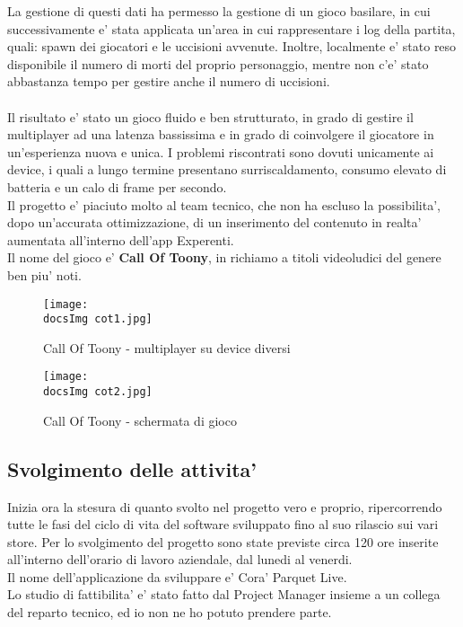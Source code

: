 La gestione di questi dati ha permesso la gestione di un gioco basilare, in cui successivamente e' stata applicata un'area in cui rappresentare i log della partita, quali: spawn dei giocatori e le uccisioni avvenute. Inoltre, localmente e' stato reso disponibile il numero di morti del proprio personaggio, mentre non c'e' stato abbastanza tempo per gestire anche il numero di uccisioni.\\\\
Il risultato e' stato un gioco fluido e ben strutturato, in grado di gestire il multiplayer ad una latenza bassissima e in grado di coinvolgere il giocatore in un'esperienza nuova e unica. I problemi riscontrati sono dovuti unicamente ai device, i quali a lungo termine presentano surriscaldamento, consumo elevato di batteria e un calo di frame per secondo.\\
Il progetto e' piaciuto molto al team tecnico, che non ha escluso la possibilita', dopo un'accurata ottimizzazione, di un inserimento del contenuto in realta' aumentata all'interno dell'app Experenti.\\
Il nome del gioco e' \textbf{Call Of Toony}, in richiamo a titoli videoludici del genere ben piu' noti.

\begin{figure}[H]
	\centering
	\texttt{[image: \\docsImg cot1.jpg]}
	\caption{Call Of Toony - multiplayer su device diversi}
	\label{fig:Call Of Toony - multiplayer}
\end{figure}

\begin{figure}[H]
	\centering
	\texttt{[image: \\docsImg cot2.jpg]}
	\caption{Call Of Toony - schermata di gioco}
	\label{fig:Call Of Toony - schermata di gioco}
\end{figure}

\subsection{Svolgimento delle attivita'}
Inizia ora la stesura di quanto svolto nel progetto vero e proprio, ripercorrendo tutte le fasi del ciclo di vita del software sviluppato fino al suo rilascio sui vari store. Per lo svolgimento del progetto sono state previste circa 120 ore inserite all'interno dell'orario di lavoro aziendale, dal lunedi al venerdi.\\
Il nome dell'applicazione da sviluppare e' Cora' Parquet Live.\\
Lo studio di fattibilita' e' stato fatto dal Project Manager insieme a un collega del reparto tecnico, ed io non ne ho potuto prendere parte.

